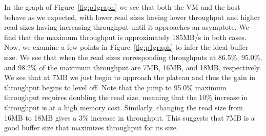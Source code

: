 In the graph of Figure~\ref{fig:p1graph} we see that both the VM and the host behave
as we expected, with lower read sizes having lower throughput and higher read sizes
having increasing throughput until it approaches an asymptote. We find that the 
maximum throughput is approximately 185MB/s in both cases. Now, we examine a few
points in Figure~\ref{fig:p1graph} to infer the ideal buffer size. We see that when 
the read sizes corresponding throughputs at 86.5\%, 95.0\%, and 98.2\% of the maximum 
throughput are 7MB, 16MB, and 18MB, respectively. We see that at 7MB we just begin to 
approach the plateau and thus the gain in throughput begins to level off.
Note that the jump to 95.0\% maximum throughput requires doubling the read size, 
meaning that the 10\% increase in throughput is at a high memory cost. Similarly, 
changing the read size from 16MB to 18MB gives a 3\% increase in throughput. This 
suggests that 7MB is a good buffer size that maximizes throughput for its size.



